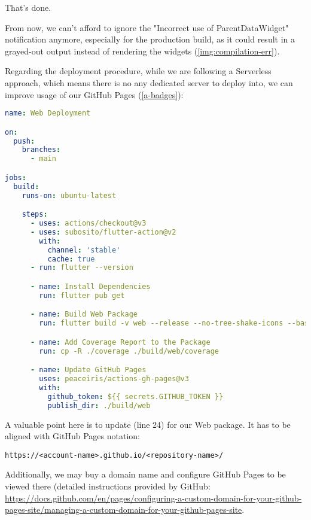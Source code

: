 \noindent That's done.

From now, we can't afford to ignore the "Incorrect use of ParentDataWidget" notification anymore, especially for the 
production build, as it could result in a grayed-out output instead of rendering the widgets (\cref{img:compilation-err}).

Regarding the deployment procedure, while we are following a Serverless approach, which means there is no any dedicated 
server to deploy into, we can improve usage of our GitHub Pages (\ref{a-badges}):

\begin{lstlisting}[language=yaml]
name: Web Deployment

on:
  push:
    branches:
      - main

jobs:
  build:
    runs-on: ubuntu-latest

    steps:
      - uses: actions/checkout@v3
      - uses: subosito/flutter-action@v2
        with:
          channel: 'stable'
          cache: true
      - run: flutter --version

      - name: Install Dependencies
        run: flutter pub get

      - name: Build Web Package
        run: flutter build -v web --release --no-tree-shake-icons --base-href="/app-finance/"

      - name: Add Coverage Report to the Package
        run: cp -R ./coverage ./build/web/coverage

      - name: Update GitHub Pages 
        uses: peaceiris/actions-gh-pages@v3
        with:
          github_token: ${{ secrets.GITHUB_TOKEN }}
          publish_dir: ./build/web
\end{lstlisting}

\noindent A valuable point here is to update  (line 24) for our Web package. It has to be aligned with 
GitHub Pages notation:

\begin{lstlisting}[language=terminal]
https://<account-name>.github.io/<repository-name>/
\end{lstlisting}

\noindent Additionally, we may buy a domain name and configure GitHub Pages to be viewed there (detailed instructions 
provided by GitHub: 
\href{https://docs.github.com/en/pages/configuring-a-custom-domain-for-your-github-pages-site/managing-a-custom-domain-for-your-github-pages-site}{https://docs.github.com/en/pages/configuring-a-custom-domain-for-your-github-pages-site/managing-a-custom-domain-for-your-github-pages-site}.


